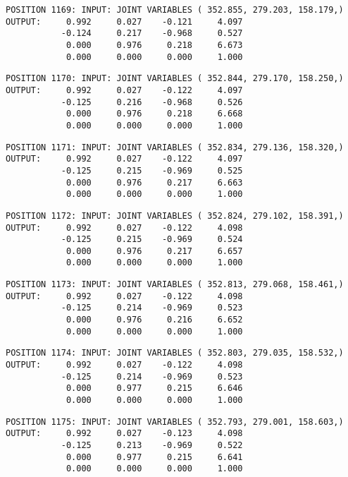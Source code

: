 \begin{verbatim}
POSITION 1169: INPUT: JOINT VARIABLES ( 352.855, 279.203, 158.179,)
OUTPUT:     0.992     0.027    -0.121     4.097
           -0.124     0.217    -0.968     0.527
            0.000     0.976     0.218     6.673
            0.000     0.000     0.000     1.000
\end{verbatim} \pagebreak[1]\begin{verbatim}
POSITION 1170: INPUT: JOINT VARIABLES ( 352.844, 279.170, 158.250,)
OUTPUT:     0.992     0.027    -0.122     4.097
           -0.125     0.216    -0.968     0.526
            0.000     0.976     0.218     6.668
            0.000     0.000     0.000     1.000
\end{verbatim} \pagebreak[1]\begin{verbatim}
POSITION 1171: INPUT: JOINT VARIABLES ( 352.834, 279.136, 158.320,)
OUTPUT:     0.992     0.027    -0.122     4.097
           -0.125     0.215    -0.969     0.525
            0.000     0.976     0.217     6.663
            0.000     0.000     0.000     1.000
\end{verbatim} \pagebreak[1]\begin{verbatim}
POSITION 1172: INPUT: JOINT VARIABLES ( 352.824, 279.102, 158.391,)
OUTPUT:     0.992     0.027    -0.122     4.098
           -0.125     0.215    -0.969     0.524
            0.000     0.976     0.217     6.657
            0.000     0.000     0.000     1.000
\end{verbatim} \pagebreak[1]\begin{verbatim}
POSITION 1173: INPUT: JOINT VARIABLES ( 352.813, 279.068, 158.461,)
OUTPUT:     0.992     0.027    -0.122     4.098
           -0.125     0.214    -0.969     0.523
            0.000     0.976     0.216     6.652
            0.000     0.000     0.000     1.000
\end{verbatim} \pagebreak[1]\begin{verbatim}
POSITION 1174: INPUT: JOINT VARIABLES ( 352.803, 279.035, 158.532,)
OUTPUT:     0.992     0.027    -0.122     4.098
           -0.125     0.214    -0.969     0.523
            0.000     0.977     0.215     6.646
            0.000     0.000     0.000     1.000
\end{verbatim} \pagebreak[1]\begin{verbatim}
POSITION 1175: INPUT: JOINT VARIABLES ( 352.793, 279.001, 158.603,)
OUTPUT:     0.992     0.027    -0.123     4.098
           -0.125     0.213    -0.969     0.522
            0.000     0.977     0.215     6.641
            0.000     0.000     0.000     1.000
\end{verbatim} \pagebreak[1]\begin{verbatim}

\end{verbatim}
